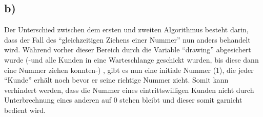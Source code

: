 \documentclass[11pt,a4paper,DIV=10,]{scrartcl}
\begin{document}
\subsection*{b)}
Der Unterschied zwischen dem ersten und zweiten Algorithmus besteht darin, dass der Fall des ``gleichzeitigen Ziehens einer Nummer'' nun anders behandelt wird. Während vorher dieser Bereich durch die Variable ``drawing'' abgesichert wurde (-und alle Kunden in eine Warteschlange geschickt wurden, bis diese dann eine Nummer ziehen konnten-) , gibt es nun eine initiale Nummer (1), die jeder ``Kunde'' erhält noch bevor er seine richtige Nummer zieht. Somit kann verhindert werden, dass die Nummer eines eintrittswilligen Kunden nicht durch Unterbrechnung eines anderen auf 0 stehen bleibt und dieser somit garnicht bedient wird. 



\end{document}
